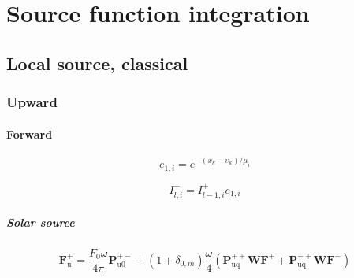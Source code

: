 %
\section{Source function integration}
\label{sec:source_function_integration}


%
\subsection{Local source, classical}
\label{sec:source_function_integration-local_source_classical}


%
\subsubsection{Upward}
\label{sec:source_function_integration-local_source_classical-upward}


%
\paragraph{Forward}
\label{sec:source_function_integration-local_source_classical-upward-forward}

\begin{equation}
e_{1,i} = e^{-(x_{k} - \upsilon_{k}) / \mu_{i}}
\label{eq:source_function_integration-local_source_classical-upward-forward-e_1_i}
\end{equation}

\begin{equation}
I^{+}_{l,i} = I^{+}_{l-1,i} e_{1,i}
\label{eq:source_function_integration-local_source_classical-upward-forward-I_p_l_i_1}
\end{equation}


\subparagraph{Solar source}
\label{sec:source_function_integration-local_source_classical-upward-forward-solar_source}

\begin{equation}
\mathbf{F}^{+}_{\mathrm{u}} = \frac{F_{0}\omega}{4\pi}\mathbf{P}^{+-}_{\mathrm{u0}} + (1 + \delta_{0,m}) \frac{\omega}{4}(\mathbf{P}^{++}_{\mathrm{uq}}\mathbf{W}\mathbf{F}^{+} + \mathbf{P}^{-+}_{\mathrm{uq}}\mathbf{W}\mathbf{F}^{-})
\label{eq:source_function_integration-local_source_classical-upward-forward-solar_source-F_p_u}
\end{equation}

